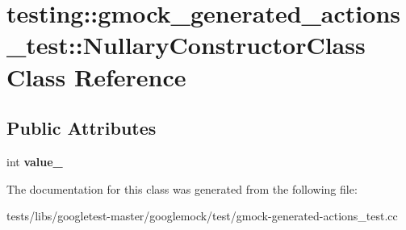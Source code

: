 \hypertarget{classtesting_1_1gmock__generated__actions__test_1_1NullaryConstructorClass}{}\section{testing\+:\+:gmock\+\_\+generated\+\_\+actions\+\_\+test\+:\+:Nullary\+Constructor\+Class Class Reference}
\label{classtesting_1_1gmock__generated__actions__test_1_1NullaryConstructorClass}
\subsection*{Public Attributes}
\begin{DoxyCompactItemize}
\item 
\mbox{\label{classtesting_1_1gmock__generated__actions__test_1_1NullaryConstructorClass_aa877ccc5aff335cbf81b8de90abee732}} 
int {\bfseries value\+\_\+}
\end{DoxyCompactItemize}


The documentation for this class was generated from the following file\+:\begin{DoxyCompactItemize}
\item 
tests/libs/googletest-\/master/googlemock/test/gmock-\/generated-\/actions\+\_\+test.\+cc\end{DoxyCompactItemize}
